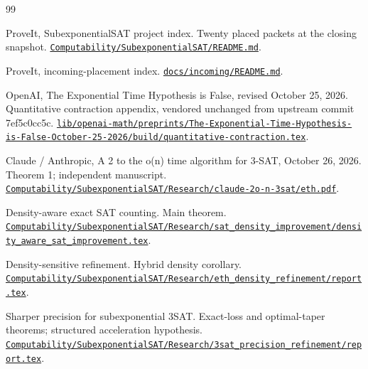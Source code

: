 \begin{thebibliography}{99}

 ProveIt, SubexponentialSAT project index. Twenty placed packets at the closing snapshot.
\href{https://github.com/VladimirReshetnikov/ProveIt/blob/dde01c4a63b822c25b8eb345299346c36f837b49/Computability/SubexponentialSAT/README.md}{\nolinkurl{Computability/SubexponentialSAT/README.md}}.

 ProveIt, incoming-placement index.
\href{https://github.com/VladimirReshetnikov/ProveIt/blob/dde01c4a63b822c25b8eb345299346c36f837b49/docs/incoming/README.md}{\nolinkurl{docs/incoming/README.md}}.

 OpenAI, The Exponential Time Hypothesis is False, revised October 25, 2026. Quantitative contraction appendix, vendored unchanged from upstream commit 7ef5c0cc5c.
\href{https://github.com/VladimirReshetnikov/ProveIt/blob/dde01c4a63b822c25b8eb345299346c36f837b49/lib/openai-math/preprints/The-Exponential-Time-Hypothesis-is-False-October-25-2026/build/quantitative-contraction.tex}{\nolinkurl{lib/openai-math/preprints/The-Exponential-Time-Hypothesis-is-False-October-25-2026/build/quantitative-contraction.tex}}.

 Claude / Anthropic, A 2 to the o(n) time algorithm for 3-SAT, October 26, 2026. Theorem 1; independent manuscript. 
\href{https://github.com/VladimirReshetnikov/ProveIt/blob/dde01c4a63b822c25b8eb345299346c36f837b49/Computability/SubexponentialSAT/Research/claude-2o-n-3sat/eth.pdf}{\nolinkurl{Computability/SubexponentialSAT/Research/claude-2o-n-3sat/eth.pdf}}.

 Density-aware exact SAT counting. Main theorem.
\href{https://github.com/VladimirReshetnikov/ProveIt/blob/dde01c4a63b822c25b8eb345299346c36f837b49/Computability/SubexponentialSAT/Research/sat_density_improvement/density_aware_sat_improvement.tex}{\nolinkurl{Computability/SubexponentialSAT/Research/sat_density_improvement/density_aware_sat_improvement.tex}}.

 Density-sensitive refinement. Hybrid density corollary.
\href{https://github.com/VladimirReshetnikov/ProveIt/blob/dde01c4a63b822c25b8eb345299346c36f837b49/Computability/SubexponentialSAT/Research/eth_density_refinement/report.tex}{\nolinkurl{Computability/SubexponentialSAT/Research/eth_density_refinement/report.tex}}.

 Sharper precision for subexponential 3SAT. Exact-loss and optimal-taper theorems; structured acceleration hypothesis.
\href{https://github.com/VladimirReshetnikov/ProveIt/blob/dde01c4a63b822c25b8eb345299346c36f837b49/Computability/SubexponentialSAT/Research/3sat_precision_refinement/report.tex}{\nolinkurl{Computability/SubexponentialSAT/Research/3sat_precision_refinement/report.tex}}.


\end{thebibliography}
